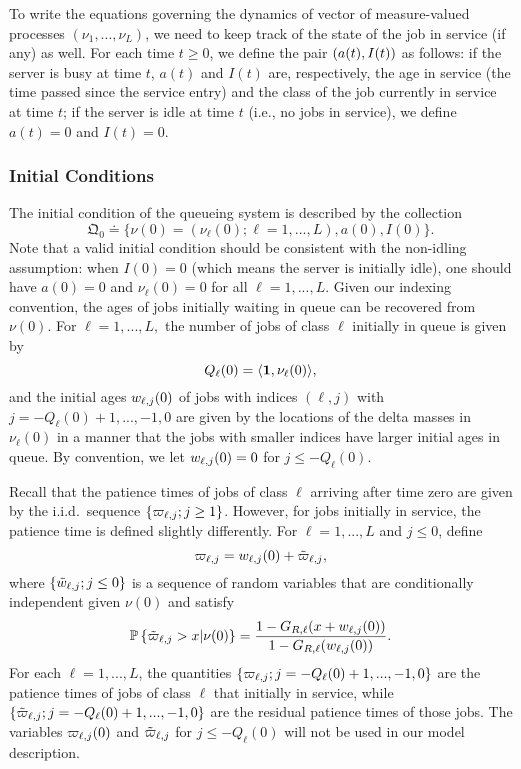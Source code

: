 \documentclass{article}
\theoremstyle{definition}
\numberwithin{equation}{section}
\begin{document}
To write the equations governing the dynamics of vector of measure-valued processes $(\nu_1,...,\nu_L)$, we need to keep track of the state of the job in service (if any) as well. For each time $t\geq0$, we define the pair $(a(t),I(t))$ as follows: if the server is busy at time $t$, $a(t)$ and $I(t)$ are, respectively, the age in service (the time passed since the service entry) and the class of the job currently in service at time $t$; if the server is idle at time $t$ (i.e., no jobs in service), we define $a(t)=0$ and $I(t)=0$. 

\subsubsection*{Initial Conditions}
The initial condition of the queueing system is described by the collection
\begin{equation}\label{ic}
\mathfrak{Q}_0\doteq\{\nu(0)=(\nu_\ell(0);\ell=1,...,L),a(0),I(0)\}.
\end{equation}
Note that a valid initial condition should be consistent with the non-idling assumption: when $I(0)=0$ (which means the server is initially idle), one should have $a(0)=0$ and $\nu_\ell(0)=0$ for all $\ell=1,...,L$. Given our indexing convention, the ages of jobs initially waiting in queue can be recovered from $\nu(0)$. For $\ell=1,...,L,$ the number of jobs of class $\ell$ initially in queue is given by 
\begin{equation}\label{QLzero}
Q_\ell(0)=\langle\f1,\nu_\ell(0) \rangle,
\end{equation}
and the initial ages $w_{\ell,j}(0)$ of jobs with indices $(\ell,j)$ with $j=-Q_\ell(0)+1,...,-1,0$ are given by the locations of the delta masses in $\nu_\ell(0)$ in a manner that the jobs with smaller indices have larger initial ages in queue. By convention, we let $w_{\ell,j}(0)=0$ for $j\leq -Q_\ell(0)$.

Recall that the patience times of jobs of class $\ell$ arriving after time zero are given by the i.i.d.\ sequence $\{\varpi_{\ell,j}; j\geq1\}$. However, for jobs initially in service, the patience time is defined slightly differently. For $\ell=1,...,L$ and  $j\leq 0$, define
\begin{equation}\label{def_initial_age}
\varpi_{\ell,j}=w_{\ell,j}(0)+\tilde{\varpi}_{\ell,j},
\end{equation}
where $\{\tilde{w}_{\ell,j};j\leq0\}$ is a sequence of random variables that are conditionally independent given $\nu(0)$ and satisfy
\[
\mathbb{P}\left\{\tilde{\varpi}_{\ell,j}>x|\nu(0)\right\}=\frac{1- G_{R,\ell}(x+w_{\ell,j}(0))}{1- G_{R,\ell}(w_{\ell,j}(0))}. 
\]
For each $\ell=1,...,L$, the quantities $\{\varpi_{\ell,j};j=-Q_\ell(0)+1,...,-1,0\}$ are the patience times of jobs of class $\ell$ that initially in service, while $\{\tilde{\varpi}_{\ell,j};j=-Q_\ell(0)+1,...,-1,0\}$ are the residual patience times of those jobs. The variables $\varpi_{\ell,j}(0)$ and $\tilde {\varpi}_{\ell,j}$ for $j\leq -Q_\ell(0)$ will not be used in our model description. 
\end{document}
